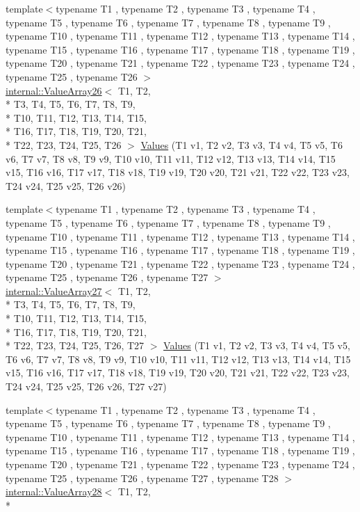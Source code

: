 \begin{DoxyCompactItemize}
\item 
{\footnotesize template$<$typename T1 , typename T2 , typename T3 , typename T4 , typename T5 , typename T6 , typename T7 , typename T8 , typename T9 , typename T10 , typename T11 , typename T12 , typename T13 , typename T14 , typename T15 , typename T16 , typename T17 , typename T18 , typename T19 , typename T20 , typename T21 , typename T22 , typename T23 , typename T24 , typename T25 , typename T26 $>$ }\\\hyperlink{classtesting_1_1internal_1_1ValueArray26}{internal\-::\-Value\-Array26}$<$ T1, T2, \\*
T3, T4, T5, T6, T7, T8, T9, \\*
T10, T11, T12, T13, T14, T15, \\*
T16, T17, T18, T19, T20, T21, \\*
T22, T23, T24, T25, T26 $>$ \hyperlink{namespacetesting_aeca27a322529e5bbd6331e40c810a123}{Values} (T1 v1, T2 v2, T3 v3, T4 v4, T5 v5, T6 v6, T7 v7, T8 v8, T9 v9, T10 v10, T11 v11, T12 v12, T13 v13, T14 v14, T15 v15, T16 v16, T17 v17, T18 v18, T19 v19, T20 v20, T21 v21, T22 v22, T23 v23, T24 v24, T25 v25, T26 v26)
\item 
{\footnotesize template$<$typename T1 , typename T2 , typename T3 , typename T4 , typename T5 , typename T6 , typename T7 , typename T8 , typename T9 , typename T10 , typename T11 , typename T12 , typename T13 , typename T14 , typename T15 , typename T16 , typename T17 , typename T18 , typename T19 , typename T20 , typename T21 , typename T22 , typename T23 , typename T24 , typename T25 , typename T26 , typename T27 $>$ }\\\hyperlink{classtesting_1_1internal_1_1ValueArray27}{internal\-::\-Value\-Array27}$<$ T1, T2, \\*
T3, T4, T5, T6, T7, T8, T9, \\*
T10, T11, T12, T13, T14, T15, \\*
T16, T17, T18, T19, T20, T21, \\*
T22, T23, T24, T25, T26, T27 $>$ \hyperlink{namespacetesting_a089ea706f6cdde715d03ab42aa3099d3}{Values} (T1 v1, T2 v2, T3 v3, T4 v4, T5 v5, T6 v6, T7 v7, T8 v8, T9 v9, T10 v10, T11 v11, T12 v12, T13 v13, T14 v14, T15 v15, T16 v16, T17 v17, T18 v18, T19 v19, T20 v20, T21 v21, T22 v22, T23 v23, T24 v24, T25 v25, T26 v26, T27 v27)
\item 
{\footnotesize template$<$typename T1 , typename T2 , typename T3 , typename T4 , typename T5 , typename T6 , typename T7 , typename T8 , typename T9 , typename T10 , typename T11 , typename T12 , typename T13 , typename T14 , typename T15 , typename T16 , typename T17 , typename T18 , typename T19 , typename T20 , typename T21 , typename T22 , typename T23 , typename T24 , typename T25 , typename T26 , typename T27 , typename T28 $>$ }\\\hyperlink{classtesting_1_1internal_1_1ValueArray28}{internal\-::\-Value\-Array28}$<$ T1, T2, \\*

\end{DoxyCompactItemize}
